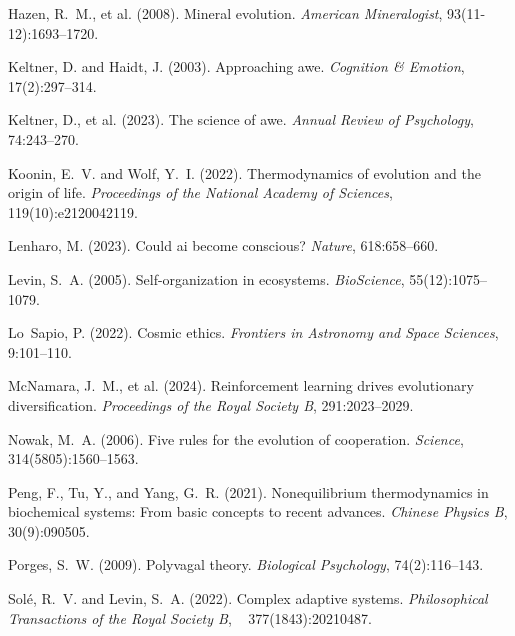 \begin{thebibliography}{}
Hazen, R.~M., et al. (2008).
\newblock Mineral evolution.
\newblock \emph{American Mineralogist}, 93(11-12):1693--1720.

Keltner, D. and Haidt, J. (2003).
\newblock Approaching awe.
\newblock \emph{Cognition \& Emotion}, 17(2):297--314.

Keltner, D., et al. (2023).
\newblock The science of awe.
\newblock \emph{Annual Review of Psychology}, 74:243--270.

Koonin, E.~V. and Wolf, Y.~I. (2022).
\newblock Thermodynamics of evolution and the origin of life.
\newblock \emph{Proceedings of the National Academy of Sciences}, 119(10):e2120042119.

Lenharo, M. (2023).
\newblock Could ai become conscious?
\newblock \emph{Nature}, 618:658--660.

Levin, S.~A. (2005).
\newblock Self-organization in ecosystems.
\newblock \emph{BioScience}, 55(12):1075--1079.

Lo~Sapio, P. (2022).
\newblock Cosmic ethics.
\newblock \emph{Frontiers in Astronomy and Space Sciences}, 9:101--110.

McNamara, J.~M., et al. (2024).
\newblock Reinforcement learning drives evolutionary diversification.
\newblock \emph{Proceedings of the Royal Society B}, 291:2023--2029.

Nowak, M.~A. (2006).
\newblock Five rules for the evolution of cooperation.
\newblock \emph{Science}, 314(5805):1560--1563.

Peng, F., Tu, Y., and Yang, G.~R. (2021).
\newblock Nonequilibrium thermodynamics in biochemical systems: From basic concepts to recent advances.
\newblock \emph{Chinese Physics B}, 30(9):090505.

Porges, S.~W. (2009).
\newblock Polyvagal theory.
\newblock \emph{Biological Psychology}, 74(2):116--143.

Sol{\'e}, R.~V. and Levin, S.~A. (2022).
\newblock Complex adaptive systems.
\newblock \emph{Philosophical Transactions of the Royal Society B},
  377(1843):20210487.


\end{thebibliography}
